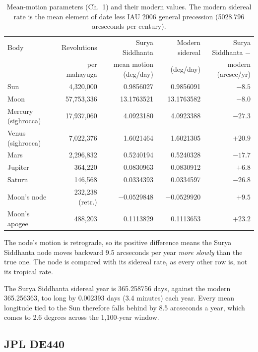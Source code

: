 \documentclass[11pt,a4paper]{article}
\newcommand{\toprule}{\hline\hline}%
\newcommand{\midrule}{\hline}%
\newcommand{\bottomrule}{\hline\hline}}
\begin{document}
\begin{table}[htbp]
\centering
\caption{Mean-motion parameters (Ch.~1) and their modern values. The modern sidereal rate is the mean element of date \citep[Table 31.A and eqs.~25.2, 47.1, 47.7]{meeus1998} less IAU 2006 general precession (5028.796 arcseconds per century).}
\label{tab:mean}
\small
\setlength{\tabcolsep}{4pt}
\begin{tabular}{@{}lrrrr@{}}
\toprule
Body & Revolutions & Surya Siddhanta & Modern sidereal & Surya Siddhanta $-$ \\
     & per mahayuga & mean motion (deg/day) & (deg/day) & modern (arcsec/yr) \\
\midrule
Sun                 & 4,320,000      & 0.9856027   & 0.9856091   & $-8.5$  \\
Moon                & 57,753,336     & 13.1763521  & 13.1763582  & $-8.0$  \\
Mercury (sighrocca) & 17,937,060     & 4.0923180   & 4.0923388   & $-27.3$ \\
Venus (sighrocca)   & 7,022,376      & 1.6021464   & 1.6021305   & $+20.9$ \\
Mars                & 2,296,832      & 0.5240194   & 0.5240328   & $-17.7$ \\
Jupiter             & 364,220        & 0.0830963   & 0.0830912   & $+6.8$  \\
Saturn              & 146,568        & 0.0334393   & 0.0334597   & $-26.8$ \\
Moon's node         & 232,238 (retr.) & $-0.0529848$ & $-0.0529920$ & $+9.5$ \\
Moon's apogee       & 488,203        & 0.1113829   & 0.1113653   & $+23.2$ \\
\bottomrule
\end{tabular}
\end{table}

The node's motion is retrograde, so its positive difference means the Surya Siddhanta node moves backward 9.5 arcseconds per year \emph{more slowly} than the true one. The node is compared with its sidereal rate, as every other row is, not its tropical rate.

The Surya Siddhanta sidereal year is 365.258756 days, against the modern 365.256363, too long by 0.002393 days (3.4 minutes) each year. Every mean longitude tied to the Sun therefore falls behind by 8.5 arcseconds a year, which comes to 2.6 degrees across the 1,100-year window.

\subsection{JPL DE440}
\end{document}

